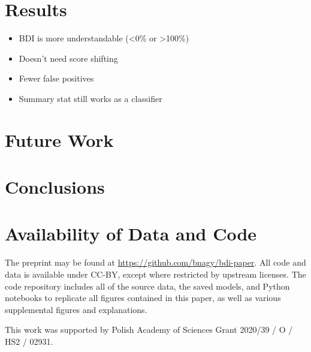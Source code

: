 \documentclass[
    hf,
]{ceurart}
\begin{document}
\section{Results}
\begin{itemize}
    \item BDI is more understandable (<0\% or >100\%)
    \item Doesn't need score shifting
    \item Fewer false positives
    \item Summary stat still works as a classifier
\end{itemize}
\section{Future Work}
\section{Conclusions}

\section{Availability of Data and Code}\label{sec:data}

The preprint may be found at \url{https://github.com/bnagy/bdi-paper}. All code
and data is available under CC-BY, except where restricted by upstream licenses.
The code repository includes all of the source data, the saved models, and
Python notebooks to replicate all figures contained in this paper, as well as
various supplemental figures and explanations.

\begin{acknowledgments}
    This work was supported by Polish Academy of Sciences Grant
    2020/39 / O / HS2 / 02931.
\end{acknowledgments}



\appendix
\onecolumn
\end{document}
